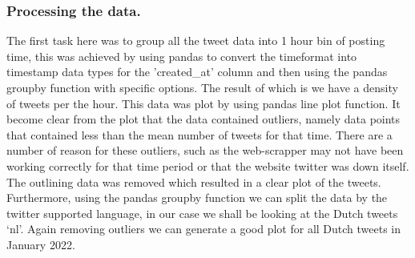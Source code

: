 \documentclass[9pt]{article}
\begin{document}
\subsubsection{Processing the data.}
The first task here was to group all the tweet data into 1 hour bin of posting time, this
was achieved by using pandas to convert the timeformat into timestamp data types for the
'created\_at' column and then using the pandas groupby function with specific options. The
result of which is we have a density of tweets per the hour. This data was plot by using
pandas line plot function. It become clear from the plot that the data contained outliers,
namely data points that contained less than the mean number of tweets for that time. There
are a number of reason for these outliers, such as the web-scrapper may not have been
working correctly for that time period or that the website twitter was down itself. The
outlining data was removed which resulted in a clear plot of the tweets. Furthermore,
using the pandas groupby function we can split the data by the twitter supported language,
in our case we shall be looking at the Dutch tweets `nl'. Again removing outliers we can
generate a good plot for all Dutch tweets in January 2022.
\end{document}
